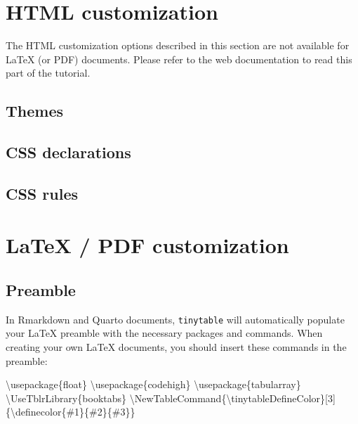 \documentclass[
  letterpaper,
  DIV=11,
  numbers=noendperiod]{scrartcl}
\newenvironment{Shaded}{\begin{snugshade}}{\end{snugshade}}
\newcommand{\BuiltInTok}[1]{\textcolor[rgb]{0.00,0.23,0.31}{#1}}
\newcommand{\ExtensionTok}[1]{\textcolor[rgb]{0.00,0.23,0.31}{#1}}
\newcommand{\FunctionTok}[1]{\textcolor[rgb]{0.28,0.35,0.67}{#1}}
\newcommand{\NormalTok}[1]{\textcolor[rgb]{0.00,0.23,0.31}{#1}}
\begin{document}
\section{HTML customization}\label{html-customization}

The HTML customization options described in this section are not
available for LaTeX (or PDF) documents. Please refer to the web
documentation to read this part of the tutorial.

\subsection{Themes}\label{themes-1}

\subsection{CSS declarations}\label{css-declarations}

\subsection{CSS rules}\label{css-rules}

\section{LaTeX / PDF customization}\label{latex-pdf-customization}

\subsection{Preamble}\label{preamble}

In Rmarkdown and Quarto documents, \texttt{tinytable} will automatically
populate your LaTeX preamble with the necessary packages and commands.
When creating your own LaTeX documents, you should insert these commands
in the preamble:

\begin{Shaded}
\begin{Highlighting}[]
\BuiltInTok{\textbackslash{}usepackage}\NormalTok{\{}\ExtensionTok{float}\NormalTok{\}}
\BuiltInTok{\textbackslash{}usepackage}\NormalTok{\{}\ExtensionTok{codehigh}\NormalTok{\}}
\BuiltInTok{\textbackslash{}usepackage}\NormalTok{\{}\ExtensionTok{tabularray}\NormalTok{\}}
\FunctionTok{\textbackslash{}UseTblrLibrary}\NormalTok{\{booktabs\}}
\FunctionTok{\textbackslash{}NewTableCommand}\NormalTok{\{}\FunctionTok{\textbackslash{}tinytableDefineColor}\NormalTok{\}[3]\{}\FunctionTok{\textbackslash{}definecolor}\NormalTok{\{\#1\}\{\#2\}\{\#3\}\}}
\end{Highlighting}
\end{Shaded}
\end{document}
